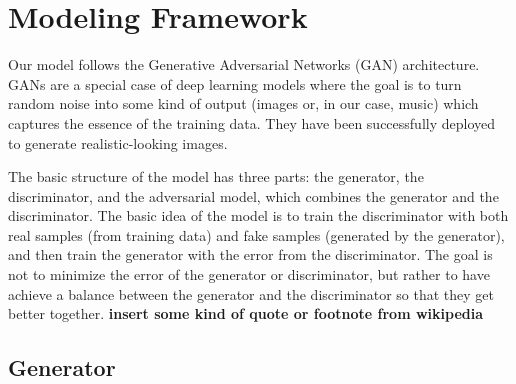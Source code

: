 \documentclass[12pt,oneside]{chicagocapstone}
\begin{document}
\newpage

\hypertarget{methodology-modeling}{%
\section*{Modeling Framework}\label{methodology-modeling}}

Our model follows the Generative Adversarial Networks (GAN) architecture. GANs are a special case of deep learning models where the goal is to turn random noise into some kind of output (images or, in our case, music) which captures the essence of the training data. They have been successfully deployed to generate realistic-looking images.

The basic structure of the model has three parts: the generator, the discriminator, and the adversarial model, which combines the generator and the discriminator. The basic idea of the model is to train the discriminator with both real samples (from training data) and fake samples (generated by the generator), and then train the generator with the error from the discriminator. The goal is not to minimize the error of the generator or discriminator, but rather to have achieve a balance between the generator and the discriminator so that they get better together. \textbf{insert some kind of quote or footnote from wikipedia}

\hypertarget{generator}{%
\subsection*{Generator}\label{generator}}
\end{document}
